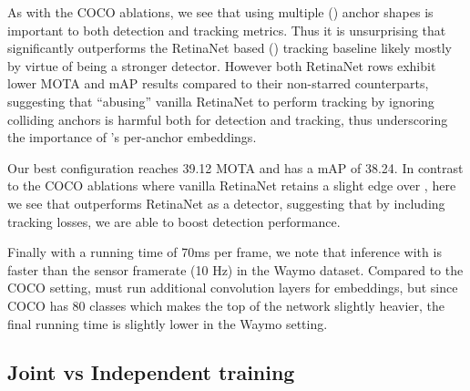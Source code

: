As with the COCO ablations, we see that using multiple
() anchor shapes is important to both detection
and tracking metrics.
Thus it is unsurprising that
\modelname significantly outperforms the RetinaNet based () tracking baseline likely mostly by virtue of being a stronger detector.
However both RetinaNet rows exhibit lower MOTA and mAP results compared to their
non-starred counterparts, suggesting that ``abusing'' vanilla RetinaNet to perform
tracking by ignoring colliding anchors is harmful both for detection and tracking, 
thus underscoring the importance of \modelname's per-anchor embeddings.

Our best \modelname configuration reaches 39.12 MOTA and has a mAP of 38.24.
In contrast to the COCO ablations where vanilla RetinaNet retains a
slight edge over \modelname, here 
we see that \modelname outperforms  RetinaNet as a detector, suggesting that by
 including  tracking losses, we are able to boost detection performance.

 

 

Finally with a running time of 70ms per frame, we note that
inference with \modelname is faster than
the sensor framerate (10 Hz) in the Waymo dataset. 
Compared to the COCO setting, \modelname must run additional
convolution layers for embeddings, but since COCO has 80 classes which
makes the top of the network slightly heavier, the final running time is
slightly lower in the Waymo setting.

    
\vspace{-1mm}
\subsection{Joint vs Independent training}\label{sec:joint}
\vspace{-1mm}

